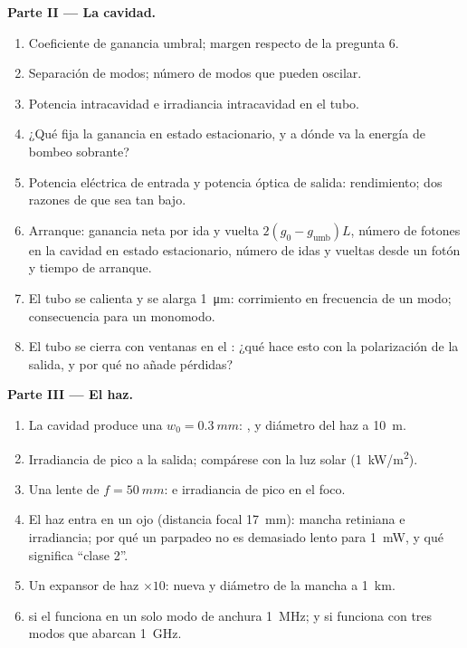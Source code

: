 \begin{problem}
\textbf{Parte II --- La cavidad.}
\begin{enumerate}[resume]
  \item Coeficiente de ganancia umbral; margen respecto de la pregunta 6.
  \item Separación de modos; número de modos que pueden oscilar.
  \item Potencia intracavidad e irradiancia intracavidad en el tubo.
  \item ¿Qué fija la ganancia en estado estacionario, y a dónde va la energía
        de bombeo sobrante?
  \item Potencia eléctrica de entrada y potencia óptica de salida: rendimiento; dos
        razones de que sea tan bajo.
  \item Arranque: ganancia neta por ida y vuelta $2(g_0 - g_{\text{umb}})L$,
        número de fotones en la cavidad en estado estacionario, número de
        idas y vueltas desde un fotón y tiempo de arranque.
  \item El tubo se calienta y se alarga \qty{1}{\micro m}: corrimiento en frecuencia
        de un modo; consecuencia para un  monomodo.
  \item El tubo se cierra con ventanas en el : ¿qué hace
        esto con la polarización de la salida, y por qué no añade
        pérdidas?
\end{enumerate}

\textbf{Parte III --- El haz.}
\begin{enumerate}[resume]
  \item La cavidad produce una  $w_0 = \qty{0.3}{mm}$: ,  y diámetro del haz a \qty{10}{m}.
  \item Irradiancia de pico a la salida; compárese con la luz solar
        (\qty{1}{kW/m^2}).
  \item Una lente de $f = \qty{50}{mm}$:  e irradiancia de pico en el
        foco.
  \item El haz entra en un ojo (distancia focal \qty{17}{mm}): mancha retiniana
        e irradiancia; por qué un parpadeo no es demasiado lento para \qty{1}{mW},
        y qué significa ``clase 2''.
  \item Un expansor de haz $\times 10$: nueva  y diámetro de la mancha
        a \qty{1}{km}.
  \item {} si el  funciona en un solo modo de anchura
        \qty{1}{MHz}; y si funciona con tres modos que abarcan \qty{1}{GHz}.
\end{enumerate}


\end{problem}
